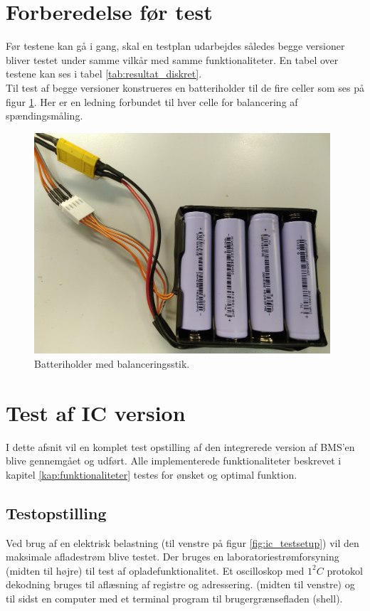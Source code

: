 \section{Forberedelse før test}\label{afs:tests}
Før testene kan gå i gang, skal en testplan udarbejdes således begge versioner bliver testet under samme vilkår med samme funktionaliteter. En tabel over testene kan ses i tabel \ref{tab:resultat_diskret}.
\\

Til test af begge versioner konstrueres en batteriholder til de fire celler som ses på figur \ref{fig:battery_holder}. Her er en ledning forbundet til hver celle for balancering af spændingsmåling.

\begin{figure}[h]
	\centering
	\includegraphics[width=11cm]{billeder/battery_holder.jpg}
	\caption{Batteriholder med balanceringsstik.}
	\label{fig:battery_holder}
\end{figure}

\section{Test af IC version}\label{afs:test_ic}
I dette afsnit vil en komplet test opstilling af den integrerede version af BMS'en blive gennemgået og udført. Alle implementerede funktionaliteter beskrevet i kapitel \ref{kap:funktionaliteter} testes for ønsket og optimal funktion. 

\subsection{Testopstilling}
Ved brug af en elektrisk belastning (til venstre på figur \ref{fig:ic_testsetup}) vil den maksimale afladestrøm blive testet. Der bruges en laboratoriestrømforsyning (midten til højre) til test af opladefunktionalitet. Et oscilloskop med $1^2C$ protokol dekodning bruges til aflæsning af registre og adressering. (midten til venstre) og til sidst en computer med et terminal program til brugergrænsefladen (shell). 

